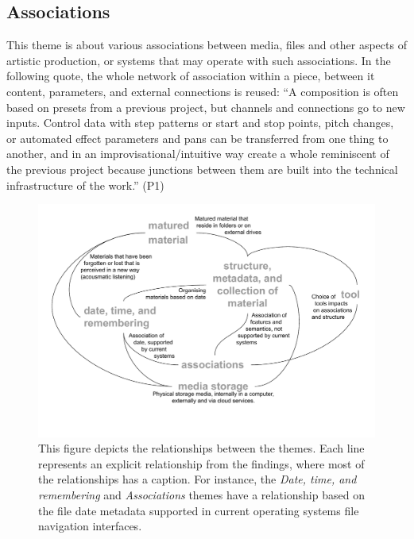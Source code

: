 \documentclass[runningheads,a4paper]{cmmr2023}
\begin{document}
\subsection{Associations}
\label{sec:associations}
This theme is about various associations between media, files and other aspects of artistic production, or systems that may operate with such associations. In the following quote, the whole network of association within a piece, between it content, parameters, and external connections is reused:  “A composition is often based on presets from a previous project, but channels and connections go to new inputs. Control data with step patterns or start and stop points, pitch changes, or automated effect parameters and pans can be transferred from one thing to another, and in an improvisational/intuitive way create a whole reminiscent of the previous project because junctions between them are built into the technical infrastructure of the work.” (P1)
\begin{figure}
    \centering
    \includegraphics[width=\textwidth]{finding_reminding_no_stage_picture.pdf}
    \caption{This figure depicts the relationships between the themes. Each line represents an explicit relationship from the findings, where most of the relationships has a caption. For instance, the \emph{Date, time, and remembering} and \emph{Associations} themes have a relationship based on the file date metadata supported in current operating systems file navigation interfaces.}
    \label{fig:findings_1}
\end{figure}
\end{document}
